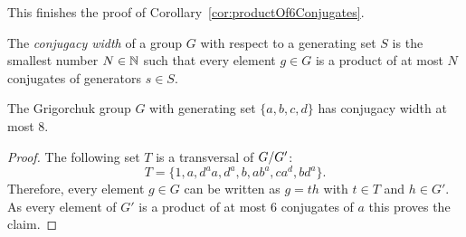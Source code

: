 \documentclass[a4paper,11pt]{amsart}
\begin{document}
This finishes the proof of Corollary~\ref{cor:productOf6Conjugates}.
\begin{defi}
 The \emph{conjugacy width} of a group $G$ with respect to a generating set $S$ 
 is the smallest number $N\in\mathbb{N}$ such that every element $g\in G$ is a product of
 at most $N$ conjugates of generators $s\in S$.
\end{defi}
\begin{cor}
 The Grigorchuk group $G$ with generating set $\{a,b,c,d\}$ has conjugacy width at most $8$.
\end{cor}
\begin{proof}
 The following set $T$ is a transversal of ${G/G'}$:
 \[T=\{1,a,d^aa,d^a,b,ab^a,ca^d,bd^a\}.\]
 Therefore, every element $g\in G$ can be written as $g=th$ with $t\in T$ and $h\in G'$. As every element of $G'$ is a product of at most $6$ conjugates of $a$ this proves the claim.

\end{proof}

\end{document}
